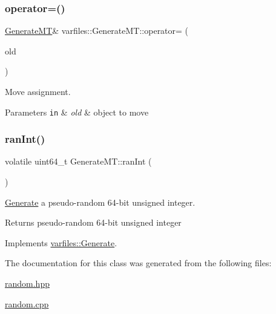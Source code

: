 \subsubsection{\texorpdfstring{operator=()}{operator=()}\hspace{0.1cm}{\footnotesize\ttfamily [2/2]}}
{\footnotesize\ttfamily \hyperlink{classvarfiles_1_1_generate_m_t}{Generate\+MT}\& varfiles\+::\+Generate\+M\+T\+::operator= (\begin{DoxyParamCaption}\item[{\hyperlink{classvarfiles_1_1_generate_m_t}{Generate\+MT} \&\&}]{old }\end{DoxyParamCaption})\hspace{0.3cm}{\ttfamily [default]}}



Move assignment. 


\begin{DoxyParams}[1]{Parameters}
\mbox{\tt in}  & {\em old} & object to move \\
\hline
\end{DoxyParams}
\mbox{\label{classvarfiles_1_1_generate_m_t_a500e163265b6fdae0a30fdacc1c37f80}} 
\subsubsection{\texorpdfstring{ran\+Int()}{ranInt()}}
{\footnotesize\ttfamily volatile uint64\+\_\+t Generate\+M\+T\+::ran\+Int (\begin{DoxyParamCaption}{ }\end{DoxyParamCaption})\hspace{0.3cm}{\ttfamily [virtual]}}



\hyperlink{classvarfiles_1_1_generate}{Generate} a pseudo-\/random 64-\/bit unsigned integer. 

\begin{DoxyReturn}{Returns}
pseudo-\/random 64-\/bit unsigned integer 
\end{DoxyReturn}


Implements \hyperlink{classvarfiles_1_1_generate_a8cac7a586f21a0def82cd68c379f9f86}{varfiles\+::\+Generate}.



The documentation for this class was generated from the following files\+:\begin{DoxyCompactItemize}
\item 
\hyperlink{random_8hpp}{random.\+hpp}\item 
\hyperlink{random_8cpp}{random.\+cpp}\end{DoxyCompactItemize}

